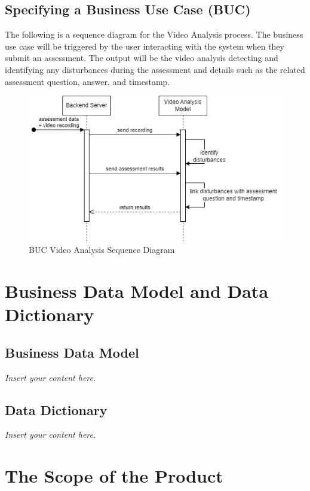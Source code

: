\documentclass[12pt]{article}
\newcommand{\lips}{\textit{Insert your content here.}}
\begin{document}
\subsection{Specifying a Business Use Case (BUC)}
The following is a sequence diagram for the Video Analysis process. The business use case will be triggered by the user interacting with the system 
when they submit an assessment. The output will be the video analysis detecting and identifying any disturbances during the 
assessment and details such as the related assessment question, answer, and timestamp.

\begin{figure}[H]
  \centering
  \includegraphics[scale=0.5]{images/BUC.png}
  \caption{BUC Video Analysis Sequence Diagram}
\end{figure}

\section{Business Data Model and Data Dictionary}
\subsection{Business Data Model}
\lips
\subsection{Data Dictionary}
\lips

\section{The Scope of the Product}
\end{document}
